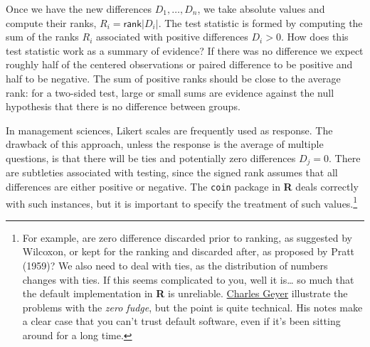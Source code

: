 \documentclass[
  11pt,
  letterpaper,
]{scrbook}
\theoremstyle{definition}
\theoremstyle{remark}
\begin{document}
Once we have the new differences \(D_1, \ldots, D_n\), we take absolute
values and compute their ranks, \(R_i = \mathsf{rank}|D_i|\). The test
statistic is formed by computing the sum of the ranks \(R_i\) associated
with positive differences \(D_i>0\). How does this test statistic work
as a summary of evidence? If there was no difference we expect roughly
half of the centered observations or paired difference to be positive
and half to be negative. The sum of positive ranks should be close to
the average rank: for a two-sided test, large or small sums are evidence
against the null hypothesis that there is no difference between groups.

In management sciences, Likert scales are frequently used as response.
The drawback of this approach, unless the response is the average of
multiple questions, is that there will be ties and potentially zero
differences \(D_j=0\). There are subtleties associated with testing,
since the signed rank assumes that all differences are either positive
or negative. The \texttt{coin} package in \textbf{R} deals correctly
with such instances, but it is important to specify the treatment of
such values.\footnote{For example, are zero difference discarded prior
  to ranking, as suggested by Wilcoxon, or kept for the ranking and
  discarded after, as proposed by Pratt (1959)? We also need to deal
  with ties, as the distribution of numbers changes with ties. If this
  seems complicated to you, well it is\ldots{} so much that the default
  implementation in \textbf{R} is unreliable.
  \href{https://www.stat.umn.edu/geyer/5601/examp/signrank.html}{Charles
  Geyer} illustrate the problems with the \emph{zero fudge}, but the
  point is quite technical. His notes make a clear case that you can't
  trust default software, even if it's been sitting around for a long
  time.}
\end{document}
